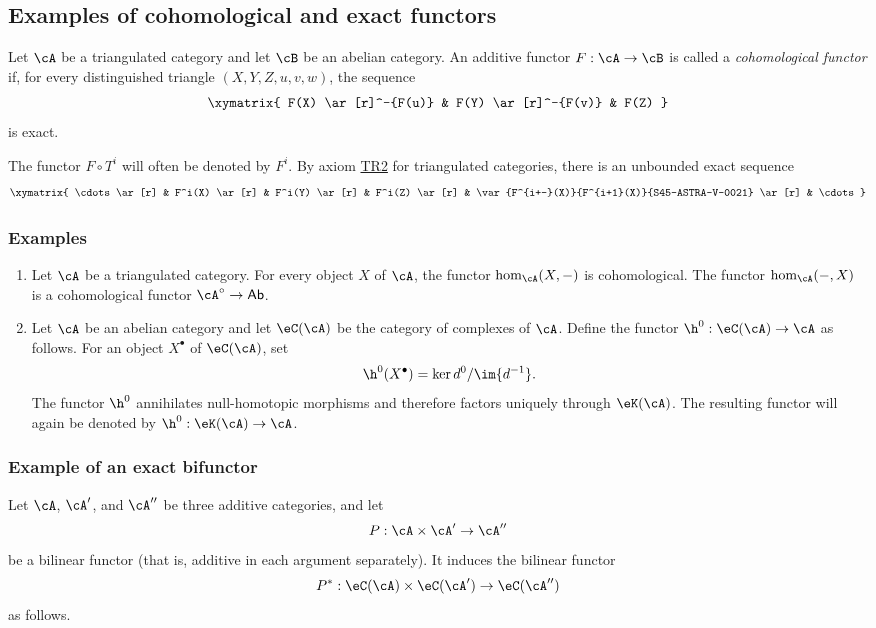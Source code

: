 \subsection{Examples of cohomological and exact functors}\label{VIII:1-3}

\begin{definition}
Let $\cA$ be a triangulated category and let $\cB$ be an abelian category.
An additive functor $F:\cA\to \cB$ is called a \emph{cohomological
functor} if, for every distinguished triangle $(X,Y,Z,u,v,w)$, the
sequence
\[\xymatrix{
  F(X) \ar[r]^-{F(u)}
    & F(Y) \ar[r]^-{F(v)}
    & F(Z)
}\]
is exact.
\end{definition}

The functor $F\circ T^i$ will often be denoted by $F^i$. By axiom
\hyperlink{VIII:TR2}{TR2} for triangulated categories, there is an
unbounded exact sequence
\[\xymatrix{
  \cdots \ar[r]
    & F^i(X) \ar[r]
    & F^i(Y) \ar[r]
    & F^i(Z) \ar[r]
    & \var{F^{i+-}(X)}{F^{i+1}(X)}{S45-ASTRA-V-0021} \ar[r]
    & \cdots
}\]

\subsubsection{Examples}\label{VIII:1-3-2}

\begin{enumerate}
  \item Let $\cA$ be a triangulated category. For every object $X$ of
    $\cA$, the functor $\hom_\cA(X,-)$ is cohomological. The functor
    $\hom_\cA(-,X)$ is a cohomological functor
    $\cA^\circ\to\mathsf{Ab}$.
  \item Let $\cA$ be an abelian category and let $\eC(\cA)$ be the category
    of complexes of $\cA$. Define the functor
    $\h^0:\eC(\cA)\to\cA$ as follows. For an object $X^\bullet$ of
    $\eC(\cA)$, set
    \[
      \h^0(X^\bullet) = \ker d^0 / \im{d^{-1}} \text{.}
    \]
    The functor $\h^0$ annihilates null-homotopic morphisms and therefore
    factors uniquely through $\eK(\cA)$. The resulting functor will again
    be denoted by $\h^0:\eK(\cA) \to \cA$.
\end{enumerate}

\subsubsection{Example of an exact bifunctor}\label{VIII:1-3-3}

Let $\cA$, $\cA'$, and $\cA''$ be three additive categories, and let
\[
  P:\cA\times \cA'\to \cA''
\]
be a bilinear functor (that is, additive in each argument separately).
It induces the bilinear functor
\[
  P^\ast:\eC(\cA)\times \eC(\cA') \to \eC(\cA'')
\]
as follows.

